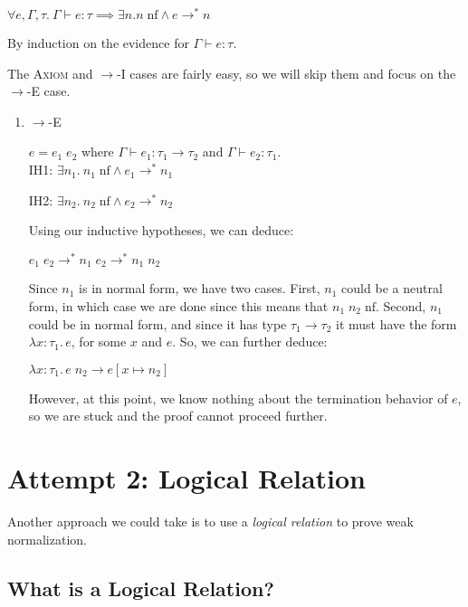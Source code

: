 \documentclass{lecturenotes}
\newcommand{\tabs}[3]{\ensuremath{\lambda #1 \colon #2.\,#3}}
\newcommand{\app}[2]{\ensuremath{#1\;#2}}
\newcommand{\nf}[1]{#1\;\text{nf}}
\newcommand{\proves}{\vdash}
\newenvironment{proof-attempt}{\noindent{\bf Proof Attempt}\hspace*{1em} \textbf{\textcolor{red}{Note: This Proof Fails!}}}{\textbf{\textcolor{red}{Proof Fails.}}}
\begin{document}
\begin{thm}
  $\forall e, \Gamma, \tau.~\Gamma \proves e : \tau \implies \exists n. \nf{n} \land e \to^\ast n$
\end{thm}
\begin{proof-attempt}
  By induction on the evidence for $\Gamma \proves e : \tau$.

  The \textsc{Axiom} and \textsc{$\to$-I} cases are fairly easy, so we will skip them and focus on the \textsc{$\to$-E} case.

  
  \begin{enumerate}
    \item \textsc{$\to$-E}
    
    $e = \app{e_1}{e_2}$ where $\Gamma \proves e_1 : \tau_1 \to \tau_2$ and $\Gamma \proves e_2 : \tau_1$. \\

    IH1: $\exists n_1.~ \nf{n_1} \land e_1 \to^\ast n_1$

    IH2: $\exists n_2.~ \nf{n_2} \land e_2 \to^\ast n_2$

    Using our inductive hypotheses, we can deduce:

    $\app{e_1}{e_2} \to^\ast \app{n_1}{e_2} \to^\ast \app{n_1}{n_2}$

    Since $n_1$ is in normal form, we have two cases.
    First, $n_1$ could be a neutral form, in which case we are done since this means that $\nf{\app{n_1}{n_2}}$.
    Second, $n_1$ could be in normal form, and since it has type $\tau_1 \to \tau_2$ it must have the form $\tabs{x}{\tau_1}{e}$, for some $x$ and $e$.
    So, we can further deduce:

    $\app{\tabs{x}{\tau_1}{e}}{n_2} \to e[x \mapsto n_2]$

    However, at this point, we know nothing about the termination behavior of $e$, so we are stuck and the proof cannot proceed further.

  \end{enumerate}

\end{proof-attempt}

\section{Attempt 2: Logical Relation}

Another approach we could take is to use a \emph{logical relation} to prove weak normalization.

\subsection{What is a Logical Relation?}
\end{document}
